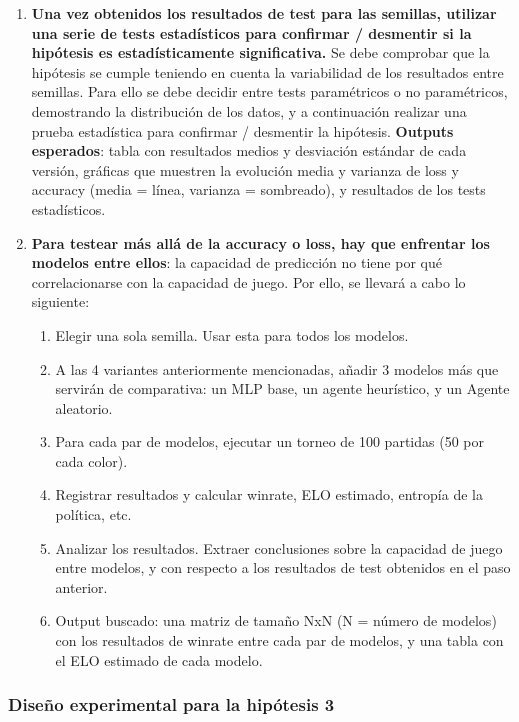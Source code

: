 \documentclass[12pt, a4paper]{article}
\begin{document}
\begin{enumerate}
\begin{itemize}
\begin{enumerate}
            \end{enumerate}
    
    \end{itemize}
    
\item \textbf{Una vez obtenidos los resultados de test para las semillas, utilizar una serie de tests estadísticos para confirmar / desmentir si la hipótesis es estadísticamente significativa.} Se debe comprobar que la hipótesis se cumple teniendo en cuenta la variabilidad de los resultados entre semillas. Para ello se debe decidir entre tests paramétricos o no paramétricos, demostrando la distribución de los datos, y a continuación realizar una prueba estadística para confirmar / desmentir la hipótesis. 
\textbf{Outputs esperados}: tabla con resultados medios y desviación estándar de cada versión, gráficas que muestren la evolución media y varianza de loss y accuracy (media = línea, varianza = sombreado), y resultados de los tests estadísticos.

\item \textbf{Para testear más allá de la accuracy o loss, hay que enfrentar los modelos entre ellos}: la capacidad de predicción no tiene por qué correlacionarse con la capacidad de juego. Por ello, se llevará a cabo lo siguiente:
    \begin{enumerate}
        \item Elegir una sola semilla. Usar esta para todos los modelos.
        \item A las 4 variantes anteriormente mencionadas, añadir 3 modelos más que servirán de comparativa: un MLP base, un agente heurístico, y un Agente aleatorio.
        \item Para cada par de modelos, ejecutar un torneo de 100 partidas (50 por cada color).
        \item Registrar resultados y calcular winrate, ELO estimado, entropía de la política, etc.
        \item Analizar los resultados. Extraer conclusiones sobre la capacidad de juego entre modelos, y con respecto a los resultados de test obtenidos en el paso anterior.
        \item Output buscado: una matriz de tamaño NxN (N = número de modelos) con los resultados de winrate entre cada par de modelos, y una tabla con el ELO estimado de cada modelo.
    \end{enumerate}
\end{enumerate}

\subsubsection{Diseño experimental para la hipótesis 3}
\end{document}
